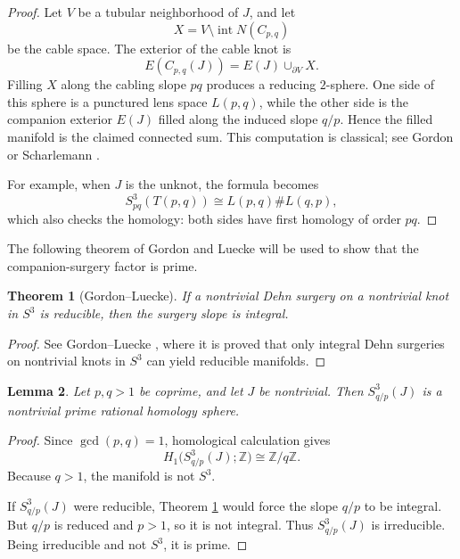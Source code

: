 \documentclass[11pt]{article}
\newtheorem{theorem}{Theorem}[section]
\newtheorem{lemma}[theorem]{Lemma}
\theoremstyle{definition}
\theoremstyle{remark}
\newcommand{\Z}{\mathbb{Z}}
\begin{document}
\begin{proof}
Let \(V\) be a tubular neighborhood of \(J\), and let
\[
X=V\setminus \operatorname{int} N(C_{p,q})
\]
be the cable space.  The exterior of the cable knot is
\[
E(C_{p,q}(J))=E(J)\cup_{\partial V} X.
\]
Filling \(X\) along the cabling slope \(pq\) produces a reducing
\(2\)-sphere.  One side of this sphere is a punctured lens space
\(L(p,q)\), while the other side is the companion exterior \(E(J)\)
filled along the induced slope \(q/p\).  Hence the filled manifold is
the claimed connected sum.  This computation is classical; see Gordon
\cite{Gordon83} or Scharlemann \cite{Scharlemann90}.

For example, when \(J\) is the unknot, the formula becomes
\[
S^3_{pq}(T(p,q))
\cong
L(p,q)\# L(q,p),
\]
which also checks the homology: both sides have first homology of
order \(pq\).
\end{proof}

The following theorem of Gordon and Luecke will be used to show that
the companion-surgery factor is prime.

\begin{theorem}[Gordon--Luecke]\label{thm:integral}
If a nontrivial Dehn surgery on a nontrivial knot in \(S^3\) is
reducible, then the surgery slope is integral.
\end{theorem}

\begin{proof}
See Gordon--Luecke \cite{GL87}, where it is proved that only integral
Dehn surgeries on nontrivial knots in \(S^3\) can yield reducible
manifolds.
\end{proof}

\begin{lemma}\label{lem:companion-prime}
Let \(p,q>1\) be coprime, and let \(J\) be nontrivial.  Then
\(S^3_{q/p}(J)\) is a nontrivial prime rational homology sphere.
\end{lemma}

\begin{proof}
Since \(\gcd(p,q)=1\), homological calculation gives
\[
H_1\bigl(S^3_{q/p}(J);\Z\bigr)\cong \Z/q\Z.
\]
Because \(q>1\), the manifold is not \(S^3\).

If \(S^3_{q/p}(J)\) were reducible, Theorem \ref{thm:integral} would
force the slope \(q/p\) to be integral.  But \(q/p\) is reduced and
\(p>1\), so it is not integral.  Thus \(S^3_{q/p}(J)\) is
irreducible.  Being irreducible and not \(S^3\), it is prime.
\end{proof}
\end{document}
